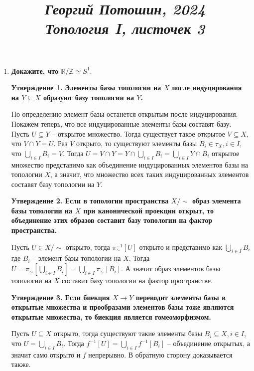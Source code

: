 \documentclass{article}
\title{
\textit{\small{Георгий Потошин, 2024}}\\
\vspace{0.3ex}
\textit{\huge{Топология I, листочек 3}}\vspace{1ex}
}
\date{\vspace{-10ex}}
\begin{document}
\maketitle

\begin{enumerate}
    \item \textbf{Докажите, что $\mathbb{R}/\mathbb{Z}\simeq S^1.$}

        \textbf{Утверждение 1. Элементы базы топологии на $X$ после
        индуцирования на $Y\subseteq X$ образуют базу топологии на $Y$.}

        По определению элемент базы останется открытым после индуцирования.
        Покажем теперь, что все индуцированные элементы базы составят
        базу. Пусть $U\subseteq Y$ – открытое множество. Тогда существует такое
        открытое $V\subseteq X$, что $V\cap Y=U$. Раз $V$ открыто, то
        существуют элементы базы $B_i\in \tau_X,i\in I$, что $\bigcup_{i\in I}
        B_i = V$. Тогда $U=V\cap Y=Y\cap\bigcup_{i\in I}B_i=\bigcup_{i\in I}Y\cap
        B_i$ открытое множество представимо как объединение индуцированных
        элементов базы на топологии $X$, а значит, что множество всех таких
        индуцированных элементов составят базу топологии на $Y$.

        \textbf{Утверждение 2. Если в топологии пространства $X/\sim$ образ
        элемента базы топологии на $X$ при канонической проекции открыт, то
        объединение этих образов составит базу топологии на фактор пространства.}
        
        Пусть $U\in X/\sim$ открыто, тогда $\pi_{\sim}^{-1}[U]$ открыто и
        представимо как $\bigcup_{i\in I}B_i$ где $B_i$ – элемент базы топологии
        на $X$. Тогда $U=\pi_{\sim}[\bigcup_{i\in I}B_i]=\bigcup_{i\in I}\pi_\sim
        [B_i]$. А значит образ элементов базы топологии на $X$ составит базу
        топологии на фактор пространстве.\par

        \textbf{Утверждение 3. Если биекция $X\longrightarrow Y$ переводит
        элементы базы в открытые множества и прообразами элементов базы тоже
        являются открытые множества, то биекция является гомеоморфизмом.}\par
        
        Пусть $U\subseteq X$ открыто, тогда существуют такие элементы базы
        $B_i\subseteq X,i\in I$, что $U=\bigcup_{i\in I}B_i$. Тогда $f^{-1}[U]=
        \bigcup_{i\in I}f^{-1}[B_i]$ – объединение открытых, а значит само
        открыто и $f$ непрерывно. В обратную сторону доказывается также.


\end{enumerate}
\end{document}
